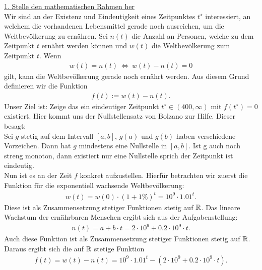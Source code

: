 \underline{1. Stelle den mathematischen Rahmen her}\\
Wir sind an der Existenz und Eindeutigkeit eines Zeitpunktes $ t^\star $ interessiert, an welchem die vorhandenen Lebensmittel gerade noch ausreichen, um die Weltbevölkerung zu ernähren. Sei $ n(t)  $ die Anzahl an Personen, welche zu dem Zeitpunkt $ t $ ernährt werden können und $ w(t) $ die Weltbevölkerung zum Zeitpunkt $ t $.
Wenn 
\begin{align*}
	w(t) = n(t) \ \Leftrightarrow \ w(t) - n(t) = 0
\end{align*}
gilt, kann die Weltbevölkerung gerade noch ernährt werden. Aus diesem Grund definieren wir die Funktion
\begin{align*}
	f(t) := w(t) - n(t).
\end{align*}
Unser Ziel ist: Zeige das ein eindeutiger Zeitpunkt $ t^\star \in (400, \infty) $ mit $ f(t^\star) = 0 $ existiert.
Hier kommt uns der Nullstellensatz von Bolzano zur Hilfe. Dieser besagt: \\
Sei $ g  $ stetig auf dem Intervall $  [a,b] $, $ g(a) $ und $ g(b) $ haben verschiedene Vorzeichen. Dann hat $ g $ mindestens eine Nullstelle in $ [a,b] $. Ist g auch noch streng monoton, dann existiert nur eine Nullstelle sprich der Zeitpunkt ist eindeutig. \\
Nun ist es an der Zeit $ f $ konkret aufzustellen. Hierfür betrachten wir zuerst die Funktion für die exponentiell wachsende Weltbevölkerung:
\begin{align*}
	w(t) = w(0) \cdot (1 + 1 \% )^t= 10^9 \cdot 1.01^t.
\end{align*}
Diese ist als Zusammensetzung stetiger Funktionen stetig auf $ \mathbb{R} $. Das lineare Wachstum der ernährbaren Menschen ergibt sich aus der Aufgabenstellung:
\begin{align*}
	n(t) = a + b \cdot t
	= 2 \cdot 10^9 + 0.2 \cdot 10^9 \cdot t.
\end{align*}
Auch diese Funktion ist als Zusammensetzung stetiger Funktionen stetig auf $ \mathbb{R} $.
Daraus ergibt sich die auf $ \mathbb{R} $ stetige Funktion 
\begin{align*}
	f(t) = w(t) - n(t)
	=
	10^9 \cdot 1.01^t - (2 \cdot 10^9 + 0.2 \cdot 10^9 \cdot t).
\end{align*}

